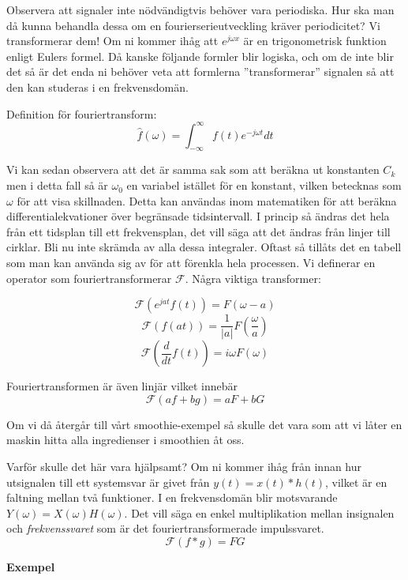\documentclass{article}
\begin{document}
Observera att signaler inte nödvändigtvis behöver vara periodiska.
Hur ska man då kunna behandla dessa om en fourierserieutveckling kräver
periodicitet? Vi transformerar dem! Om ni kommer ihåg att
$e^{j\omega x}$ är en trigonometrisk funktion enligt Eulers formel.
Då kanske följande formler blir logiska, och om de inte blir det så är det
enda ni behöver veta att formlerna ''transformerar'' signalen så att den kan
studeras i en frekvensdomän.

Definition för fouriertransform:
$$\hat{f}(\omega) = \int_{-\infty}^{\infty} f(t) e^{-j \omega t} dt$$

Vi kan sedan observera att det är samma sak som att beräkna ut konstanten $C_k$
men i detta fall så är $\omega_0$ en variabel istället för en konstant,
vilken betecknas som $\omega$ för att visa skillnaden.
Detta kan användas inom matematiken för att beräkna differentialekvationer
över begränsade tidsintervall. I princip så ändras det hela från ett tidsplan
till ett frekvensplan, det vill säga att det ändras från linjer till cirklar.
Bli nu inte skrämda av alla dessa integraler.
Oftast så tillåts det en tabell som man kan använda sig av för att förenkla
hela processen. Vi definerar en operator som fouriertransformerar $\mathcal{F}$.
Några viktiga transformer:

$$\mathcal{F}(e^{j a t} f(t)) = F(\omega - a)$$%
$$\mathcal{F}(f(at)) = \frac{1}{|a|}F(\frac{\omega}{a})$$%
$$\mathcal{F}(\frac{d}{dt} f(t)) = i\omega F(\omega)$$%

Fouriertransformen är även linjär vilket innebär
$$\mathcal{F}(a f + b g) = a F + b G$$

Om vi då återgår till vårt smoothie-exempel så skulle det vara som att vi låter
en maskin hitta alla ingredienser i smoothien åt oss.

Varför skulle det här vara hjälpsamt? Om ni kommer ihåg från innan hur
utsignalen till ett systemsvar är givet från $y(t) = x(t) * h(t)$,
vilket är en faltning mellan två funktioner.
I en frekvensdomän blir motsvarande $Y(\omega) = X(\omega) H(\omega)$.
Det vill säga en enkel multiplikation mellan insignalen och
\emph{frekvenssvaret} som är det fouriertransformerade impulssvaret.
$$\mathcal{F}(f*g) = F G$$

\textbf{Exempel} %
\end{document}
